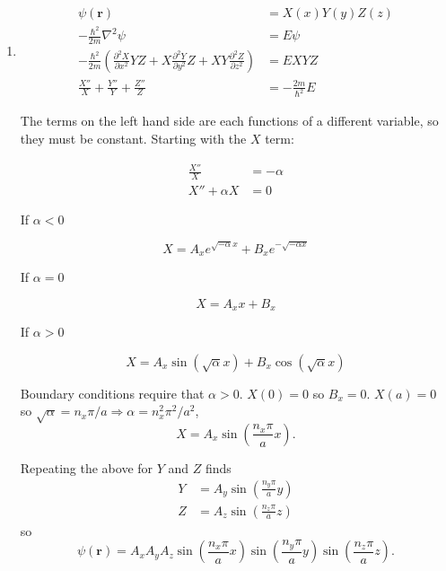 \documentclass{article}
\renewcommand{\vec}[1]{\boldsymbol{\mathbf{#1}}}
\begin{document}
\begin{enumerate}
  \item

        \begin{align*}
          \psi(\vec{r})                                                                                                                                             & = X(x) Y(y) Z(z)         \\
          -\frac{\hbar^2}{2 m} \nabla^2 \psi                                                                                                                        & = E \psi                 \\
          -\frac{\hbar^2}{2 m} \left( \frac{\partial^2 X}{\partial x^2} Y Z + X \frac{\partial^2 Y}{\partial y^2} Z + X Y \frac{\partial^2 Z}{\partial z^2} \right) & = E X Y Z                \\
          \frac{X''}{X} + \frac{Y''}{Y} + \frac{Z''}{Z}                                                                                                             & = -\frac{2 m}{\hbar^2} E
        \end{align*}

        The terms on the left hand side are each functions of a different variable, so they must be constant. Starting with the $X$ term:

        \begin{align*}
          \frac{X''}{X}  & = -\alpha \\
          X'' + \alpha X & = 0
        \end{align*}

        If $\alpha < 0$

        \[X = A_x e^{\sqrt{-\alpha} x} + B_x e^{-\sqrt{-\alpha x}}\]

        If $\alpha = 0$

        \[X = A_x x + B_x\]

        If $\alpha > 0$

        \[X = A_x \sin (\sqrt{\alpha} x) + B_x \cos (\sqrt{\alpha} x)\]

        Boundary conditions require that $\alpha > 0$. $X(0) = 0$ so $B_x = 0$. $X(a) = 0$ so $\sqrt{\alpha} = n_x \pi / a \Rightarrow \alpha = n_x^2 \pi^2 / a^2$, \[X = A_x \sin \left( \frac{n_x \pi}{a} x \right).\]

        Repeating the above for $Y$ and $Z$ finds \begin{align*}
          Y & = A_y \sin \left( \frac{n_y \pi}{a} y \right) \\
          Z & = A_z \sin \left( \frac{n_z \pi}{a} z \right)
        \end{align*} so \[\psi(\vec{r}) = A_x A_y A_z \sin \left( \frac{n_x \pi}{a} x \right) \sin \left( \frac{n_y \pi}{a} y \right) \sin \left( \frac{n_z \pi}{a} z \right).\]


\end{enumerate}
\end{document}
